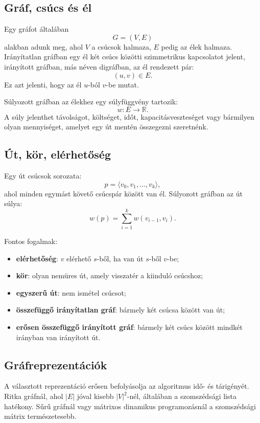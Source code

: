 \subsection{Gráf, csúcs és él}

Egy gráfot általában
\[
G=(V,E)
\]
alakban adunk meg, ahol $V$ a csúcsok halmaza, $E$ pedig az élek halmaza. Irányítatlan gráfban egy él két csúcs közötti szimmetrikus kapcsolatot jelent, irányított gráfban, más néven digráfban, az él rendezett pár:
\[
(u,v)\in E.
\]
Ez azt jelenti, hogy az él $u$-ból $v$-be mutat.

Súlyozott gráfban az élekhez egy súlyfüggvény tartozik:
\[
w:E\to\mathbb{R}.
\]
A súly jelenthet távolságot, költséget, időt, kapacitásveszteséget vagy bármilyen olyan mennyiséget, amelyet egy út mentén összegezni szeretnénk.

\subsection{Út, kör, elérhetőség}

Egy út csúcsok sorozata:
\[
p=\langle v_0,v_1,\dots,v_k\rangle,
\]
ahol minden egymást követő csúcspár között van él. Súlyozott gráfban az út súlya:
\[
w(p)=\sum_{i=1}^{k} w(v_{i-1},v_i).
\]

Fontos fogalmak:

\begin{itemize}
  \item \textbf{elérhetőség}: $v$ elérhető $s$-ből, ha van út $s$-ből $v$-be;
  \item \textbf{kör}: olyan nemüres út, amely visszatér a kiinduló csúcshoz;
  \item \textbf{egyszerű út}: nem ismétel csúcsot;
  \item \textbf{összefüggő irányítatlan gráf}: bármely két csúcsa között van út;
  \item \textbf{erősen összefüggő irányított gráf}: bármely két csúcs között mindkét irányban van irányított út.
\end{itemize}

\subsection{Gráfreprezentációk}

A választott reprezentáció erősen befolyásolja az algoritmus idő- és tárigényét. Ritka gráfnál, ahol $|E|$ jóval kisebb $|V|^2$-nél, általában a szomszédsági lista hatékony. Sűrű gráfnál vagy mátrixos dinamikus programozásnál a szomszédsági mátrix természetesebb.


